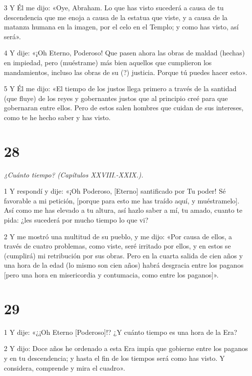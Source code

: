 \par 3 Y Él me dijo: «Oye, Abraham. Lo que has visto sucederá a causa de tu descendencia que me enoja a causa de la estatua que viste, y a causa de la matanza humana en la imagen, por el celo en el Templo; y como has visto, así será».

\par 4 Y dije: «¡Oh Eterno, Poderoso! Que pasen ahora las obras de maldad (hechas) en impiedad, pero (muéstrame) más bien aquellos que cumplieron los mandamientos, incluso las obras de su (?) justicia. Porque tú puedes hacer esto».

\par 5 Y Él me dijo: «El tiempo de los justos llega primero a través de la santidad (que fluye) de los reyes y gobernantes justos que al principio creé para que gobernaran entre ellos. Pero de estos salen hombres que cuidan de sus intereses, como te he hecho saber y has visto.

\chapter{28}

\par \textit{¿Cuánto tiempo? (Capítulos XXVIII.-XXIX.).}

\par 1 Y respondí y dije: «¡Oh Poderoso, [Eterno] santificado por Tu poder! Sé favorable a mi petición, [porque para esto me has traído aquí, y muéstramelo]. Así como me has elevado a tu altura, así hazlo saber a mí, tu amado, cuanto te pida: ¿les sucederá por mucho tiempo lo que vi?

\par 2 Y me mostró una multitud de su pueblo, y me dijo: «Por causa de ellos, a través de cuatro problemas, como viste, seré irritado por ellos, y en estos se (cumplirá) mi retribución por sus obras. Pero en la cuarta salida de cien años y una hora de la edad (lo mismo son cien años) habrá desgracia entre los paganos [pero una hora en misericordia y contumacia, como entre los paganos]».

\chapter{29}

\par 1 Y dije: «¿¡Oh Eterno [Poderoso]!? ¿Y cuánto tiempo es una hora de la Era?

\par 2 Y dijo: Doce años he ordenado a esta Era impía que gobierne entre los paganos y en tu descendencia; y hasta el fin de los tiempos será como has visto. Y considera, comprende y mira el cuadro».

